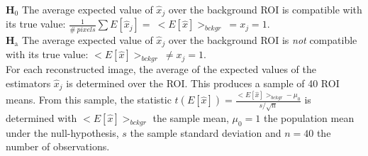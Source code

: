 \documentclass[report,12pt]{report}
\newcommand{\subscript}[1]{\ensuremath{_{\textrm{#1}}}}
\newlength\savedintextsep
\begin{document}
\textbf{H\subscript{0}} The average expected value of $\hat x_j$ over the background ROI is compatible with its true value: $\frac{1}{\#\ pixels}\sum E[\hat{x}_j] =\ <E[\hat x]>_{bckgr}\ = x_j = 1$.\\

\textbf{H\subscript{a}} The average expected value of $\hat x_j$ over the background ROI is \emph{not} compatible with its true value: $<E[\hat x]>_{bckgr}\ \neq x_j =1$.\\

For each reconstructed image, the average of the expected values of the estimators $\hat x_j$ is determined over the ROI. This produces a sample of 40 ROI means. From this sample, the statistic $t(E[\hat x]) = \frac{<E[\hat x]>_{bckgr} - \mu_0}{s / \sqrt{n}}$ is determined with $<E[\hat x]>_{bckgr}$ the sample mean, $\mu_0 = 1$ the population mean under the null-hypothesis, $s$ the sample standard deviation and $n = 40$ the number of observations.
\setlength\intextsep{\savedintextsep}
\end{document}
